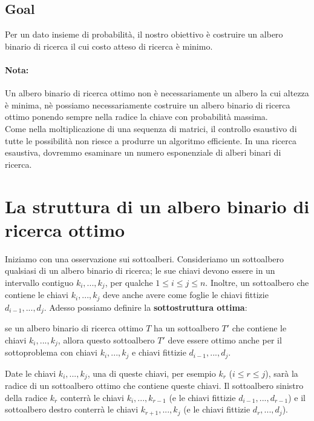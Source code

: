 \subsection{Goal}

Per un dato insieme di probabilità, il nostro obiettivo è costruire un
albero binario di ricerca il cui costo atteso di ricerca è minimo.

\paragraph*{Nota:} Un albero binario di ricerca ottimo non è necessariamente
un albero la cui altezza è minima, nè possiamo necessariamente costruire
un albero binario di ricerca ottimo ponendo sempre nella radice la
chiave con probabilità massima.\\

Come nella moltiplicazione di una sequenza di matrici, il controllo
esaustivo di tutte le possibilità non riesce a produrre un algoritmo
efficiente. In una ricerca esaustiva, dovremmo esaminare un numero
esponenziale di alberi binari di ricerca.


\section{La struttura di un albero binario di ricerca ottimo}

Iniziamo con una osservazione sui sottoalberi. Consideriamo un
sottoalbero qualsiasi di un albero binario di ricerca; le sue chiavi
devono essere in un intervallo contiguo $k_i, ..., k_j$, per qualche
$1 \le i \le j \le n$. Inoltre, un sottoalbero che contiene le chiavi
$k_i, ..., k_j$ deve anche avere come foglie le chiavi fittizie
$d_{i-1}, ..., d_j$. Adesso possiamo definire la
\textbf{sottostruttura ottima}:
\begin{myblockquote}
  se un albero
  binario di ricerca ottimo $T$ ha un sottoalbero $T'$ che contiene le
  chiavi $k_i, ..., k_j$, allora questo sottoalbero $T'$ deve essere
  ottimo anche per il sottoproblema con chiavi $k_i, ..., k_j$ e chiavi
  fittizie $d_{i-1}, ..., d_j$.
\end{myblockquote}
Date le chiavi $k_i, ..., k_j$, una di queste chiavi, per esempio
$k_r$ ($i \le r \le j$), sarà la radice di un sottoalbero ottimo che
contiene queste chiavi. Il sottoalbero sinistro della radice $k_r$
conterrà le chiavi $k_i, ..., k_{r-1}$ (e le chiavi fittizie
$d_{i-1}, ..., d_{r-1}$) e il sottoalbero destro conterrà le chiavi
$k_{r+1}, ..., k_j$ (e le chiavi fittizie $d_{r}, ..., d_{j}$).\\

